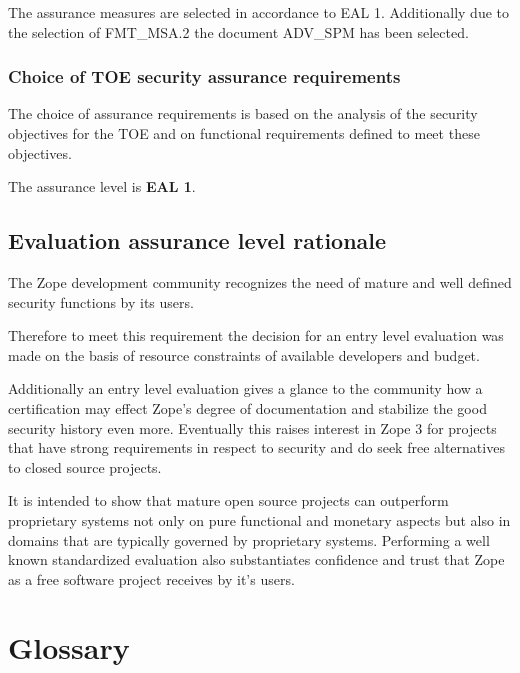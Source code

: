 \documentclass[12pt,english]{scrbook}
\begin{document}
The assurance measures are selected in accordance to EAL 1. Additionally due to
the selection of FMT\_MSA.2 the document ADV\_SPM has been selected.


\subsection{Choice of TOE security assurance requirements}

The choice of assurance requirements is based on the analysis of the security
objectives for the TOE and on functional requirements defined to meet these
objectives.

The assurance level is \textbf{EAL 1}.



\section{Evaluation assurance level rationale}

The Zope development community recognizes the need of mature and well defined
security functions by its users.

Therefore to meet this requirement the decision for an entry level evaluation
was made on the basis of resource constraints of available developers and
budget.

Additionally an entry level evaluation gives a glance to the community how a
certification may effect Zope's degree of documentation and stabilize the good
security history even more. Eventually this raises interest in Zope 3 for
projects that have strong requirements in respect to security and do seek free
alternatives to closed source projects.

It is intended to show that mature open source projects can outperform
proprietary systems not only on pure functional and monetary aspects but also
in domains that are typically governed by proprietary systems. Performing a
well known standardized evaluation also substantiates confidence and trust that
Zope as a free software project receives by it's users.




\chapter{Glossary}
\end{document}
